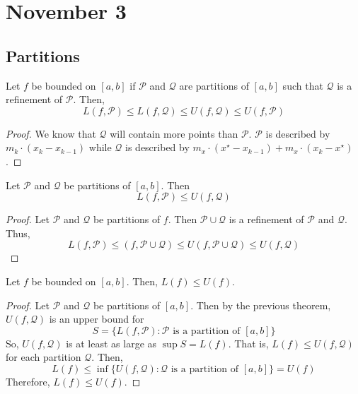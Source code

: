 \chapter{November 3}

\section{Partitions}
\begin{theorem}{}{}
    Let $f$ be bounded on $[a, b]$ if $\mathcal{P}$ and $\mathcal{Q}$ are partitions of $[a, b]$ such that $\mathcal{Q}$ is a refinement of $\mathcal{P}$. Then, $$L(f, \mathcal{P}) \leq L(f, \mathcal{Q}) \leq U(f, \mathcal{Q}) \leq U(f, \mathcal{P})$$
\end{theorem}
\begin{proof}
    We know that $\mathcal{Q}$ will contain more points than $\mathcal{P}$. $\mathcal{P}$ is described by $m_k \cdot (x_k - x_{k - 1})$ while $\mathcal{Q}$ is described by $m_x \cdot (x^\star - x_{k - 1}) + m_x \cdot (x_k - x^\star)$.
\end{proof}

\begin{theorem}{}{}
    Let $\mathcal{P}$ and $\mathcal{Q}$ be partitions of $[a, b]$. Then $$L(f, \mathcal{P}) \leq U(f, \mathcal{Q})$$
\end{theorem}
\begin{proof}
    Let $\mathcal{P}$ and $\mathcal{Q}$ be partitions of $f$. Then $\mathcal{P} \cup \mathcal{Q}$ is a refinement of $\mathcal{P}$ and $\mathcal{Q}$. Thus, $$L(f, \mathcal{P}) \leq (f, \mathcal{P} \cup \mathcal{Q}) \leq U(f, \mathcal{P} \cup \mathcal{Q}) \leq U(f, \mathcal{Q})$$
\end{proof}

\begin{theorem}{}{}
    Let $f$ be bounded on $[a, b]$. Then, $L(f) \leq U(f)$.
\end{theorem}
\begin{proof}
    Let $\mathcal{P}$ and $\mathcal{Q}$ be partitions of $[a, b]$. Then by the previous theorem, $U(f, \mathcal{Q})$ is an upper bound for $$S = \{L(f, \mathcal{P}) : \text{$\mathcal{P}$ is a partition of $[a, b]$}\}$$
    So, $U(f, \mathcal{Q})$ is at least as large as $\sup S = L(f)$. That is, $L(f) \leq U(f, \mathcal{Q})$ for each partition $\mathcal{Q}$. Then, $$L(f) \leq \inf\{U(f, \mathcal{Q}) : \text{$\mathcal{Q}$ is a partition of $[a, b]$}\} = U(f)$$
    Therefore, $L(f) \leq U(f)$.
\end{proof}

